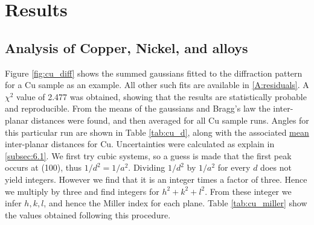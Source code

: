 \documentclass[12pt]{article}
\begin{document}
\section{Results}\label{sec:res}


\subsection{Analysis of Copper, Nickel, and alloys}

Figure \ref{fig:cu_diff} shows the summed gaussians fitted to the diffraction pattern for a Cu sample as an example.
All other such fits are available in \ref{A:residuals}.
A $\chi^2$ value of 2.477 was obtained, showing that the results are statistically probable and 
reproducible.
From the means of the gaussians and Bragg's law the inter-planar distances were found, and then averaged for all
Cu sample runs. Angles for this particular run are shown in Table \ref{tab:cu_d}, along with the associated \underline{mean}
inter-planar distances for Cu. Uncertainties were calculated as explain in \ref{subsec:6.1}.
We first try cubic systems, so a guess is made that the first peak occurs at (100), thus $1/d^2=1/a^2$. Dividing
$1/d^2$ by $1/a^2$ for every $d$ does not yield integers. However we find that it is an integer times a 
factor of three. Hence we multiply by three and find integers for $h^2+k^2+l^2$. From these 
integer we infer $h,k,l$, and hence the Miller index for each plane. Table \ref{tab:cu_miller} show the 
values obtained following this procedure.
\end{document}
